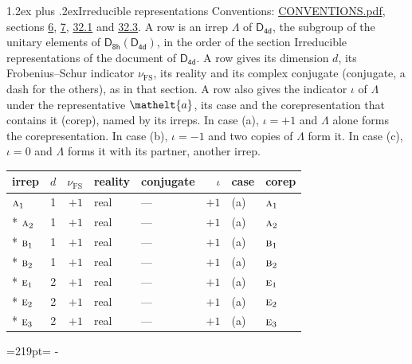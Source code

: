 \documentclass[10pt,a4paper]{article}
\makeatletter
\renewcommand\section{\@startsection{section}{1}{\z@}{-3ex plus -1ex minus -.2ex}%
  {1.2ex plus .2ex}{\normalfont\large\sffamily\bfseries\color{parttitle}}}
\newcommand{\needspace}[1]{\par\penalty-100\begingroup\dimen0=#1\relax\dimen2=\pagegoal
  \advance\dimen2-\pagetotal\ifdim\dimen0>\dimen2\relax\ifdim\dimen2>0pt\vfil\break\fi\fi
  \endgroup}
\numberwithin{equation}{section}
\newcommand{\eltfont}[1]{{\let\sigma\eltsigma\mathelt{#1}}}
\newcommand{\grp}[1]{\mathsf{#1}}
\newcommand{\irr}[1]{\text{\normalfont\scshape #1}}
\newcommand{\elt}[1]{\eltfont{#1}}
\newcommand{\fsind}{\nu_{\mathrm{FS}}}
\makeatother
\begin{document}
\section{Irreducible representations}\label{s:irreps}
Conventions: \href{../../CONVENTIONS.pdf}{CONVENTIONS.pdf}, sections \href{../../../rotation/CONVENTIONS.pdf\#conv.6}{6}, \href{../../../rotation/CONVENTIONS.pdf\#conv.7}{7}, \href{../../CONVENTIONS.pdf\#conv.32.1}{32.1} and \href{../../CONVENTIONS.pdf\#conv.32.3}{32.3}.
\leavevmode\label{n:irrep.Delta}A row is an irrep $\Lambda$ of $\grp{D_{4d}}$, the subgroup of the unitary elements of $\grp{D_{8h}}(\grp{D_{4d}})$, in the order of the section Irreducible representations of the document of \href{../../../rotation/data/pdf/D4d.pdf}{$\grp{D_{4d}}$}. \label{n:index.dimension}\label{n:index.frobenius}\label{n:head.irrep}\label{n:head.reality}\label{n:head.conjugate}A row gives its dimension $d$, its Frobenius--Schur indicator $\fsind$, its reality and its complex conjugate (conjugate, a dash for the others), as in that section. \label{n:head.case.corep}\label{n:head.corep}A row also gives the indicator $\iota$ of $\Lambda$ under the representative $\elt{a}$, its case and the corepresentation that contains it (corep), named by its irreps. In case (a), $\iota = +1$ and $\Lambda$ alone forms the corepresentation. In case (b), $\iota = -1$ and two copies of $\Lambda$ form it. In case (c), $\iota = 0$ and $\Lambda$ forms it with its partner, another irrep.
\setlength{\emergencystretch}{2em}\par\setlength{\emergencystretch}{0pt}
{\small\renewcommand{\arraystretch}{1.25}\setlength{\tabcolsep}{4pt}\begin{longtable}{@{}lrrllrll@{}}\toprule
irrep & $d$ & $\fsind$ & reality & conjugate & $\iota$ & case & corep\\\midrule\endhead
\bottomrule\endfoot\endlastfoot
$\irr{a}_{1}$ & 1 & $+1$ & real & --- & $+1$ & (a) & $\irr{a}_{1}$\\*
$\irr{a}_{2}$ & 1 & $+1$ & real & --- & $+1$ & (a) & $\irr{a}_{2}$\\*
$\irr{b}_{1}$ & 1 & $+1$ & real & --- & $+1$ & (a) & $\irr{b}_{1}$\\*
$\irr{b}_{2}$ & 1 & $+1$ & real & --- & $+1$ & (a) & $\irr{b}_{2}$\\*
$\irr{e}_{1}$ & 2 & $+1$ & real & --- & $+1$ & (a) & $\irr{e}_{1}$\\*
$\irr{e}_{2}$ & 2 & $+1$ & real & --- & $+1$ & (a) & $\irr{e}_{2}$\\*
$\irr{e}_{3}$ & 2 & $+1$ & real & --- & $+1$ & (a) & $\irr{e}_{3}$\\
\bottomrule\end{longtable}}
\needspace{219pt}
\end{document}
